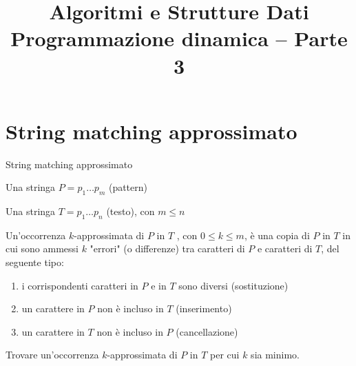

\usepackage{epigraph}
\usepackage[normalem]{ulem}
\usepackage{xcolor}
\usepackage{colortbl}
\usepackage{tikz}
\usepackage[normalem]{ulem}
\usepackage[absolute,overlay]{textpos}
\usetikzlibrary{trees}
\usetikzlibrary{shapes}
\usetikzlibrary{positioning}

\setlength{\epigraphwidth}{6cm}

\renewcommand*{\arraystretch}{1.2}
\usepackage{xmpmulti}
\usepackage{listings}


\newcommand*\circled[1]{\tikz[baseline=(char.base)]{
      \node[circle,ball color=blue, shade, 
 color=white,inner sep=1.2pt] (char) {\tiny #1};}}


\title[ASD - Programmazione Dinamica]{\textbf{Algoritmi e Strutture Dati}\\[24pt]Programmazione dinamica -- Parte 3}

\graphicspath{{figs/13/}}





\FrameTitle{}

\FrameContent

\section{String matching approssimato}

\begin{frame}[shrink=5]{String matching approssimato}

\BI
\item Una stringa $P = p_1 \ldots p_m$ (\alert{pattern})
\item Una stringa $T = p_1 \ldots p_n$ (\alert{testo}), con $m \leq n$
\EI

\medskip
{}
Un’\alert{occorrenza $k$-approssimata} di $P$ in $T$ , con $0 \leq k \leq m$, è una copia di $P$ in $T$ in cui sono ammessi $k$ "errori" (o differenze) tra caratteri di $P$ e caratteri di $T$, del seguente tipo:
\begin{enumerate}
\item i corrispondenti caratteri in $P$ e in $T$ sono diversi (\alert{sostituzione}) 
\item un carattere in $P$ non è incluso in $T$ (\alert{inserimento})
\item un carattere in $T$ non è incluso in $P$ (\alert{cancellazione})
\end{enumerate}

\medskip
{}
Trovare un’occorrenza $k$-approssimata di $P$ in $T$ per cui $k$ sia minimo.

\end{frame}

